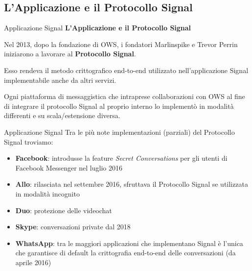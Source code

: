 \subsection{L'Applicazione e il Protocollo Signal}

\begin{frame}{Applicazione Signal}
    \textbf{L'Applicazione e il Protocollo Signal}
    \newline
    
    Nel 2013, dopo la fondazione di OWS, i fondatori Marlinspike e Trevor Perrin iniziarono a lavorare al \textbf{Protocollo Signal}.\newline\pause
    
    Esso rendeva il metodo crittografico end-to-end utilizzato nell’applicazione Signal implementabile anche da altri servizi.\newline\pause
    
    Ogni piattaforma di messaggistica che intraprese collaborazioni con OWS al fine di integrare il protocollo Signal al proprio interno lo implementò in modalità differenti e su scala/estensione diversa.

\end{frame}

\begin{frame}{Applicazione Signal}
    Tra le più note implementazioni (parziali) del Protocollo Signal troviamo:\pause
    \begin{itemize}
        \item <1-> \textbf{Facebook}: introdusse la feature \textit{Secret Conversations} per gli utenti di Facebook Messenger nel luglio 2016\pause
        \item <2-> \textbf{Allo}: rilasciata nel settembre 2016, sfruttava il Protocollo Signal se utilizzata in modalità incognito\pause
        \item <3-> \textbf{Duo}: protezione delle videochat\pause
        \item <4-> \textbf{Skype}: conversazioni private dal 2018\pause
        \item <5-> \textbf{WhatsApp}: tra le maggiori applicazioni che implementano Signal è l’unica che garantisce di default la crittografia end-to-end delle conversazioni (da aprile 2016)
    \end{itemize}
    
\end{frame}

